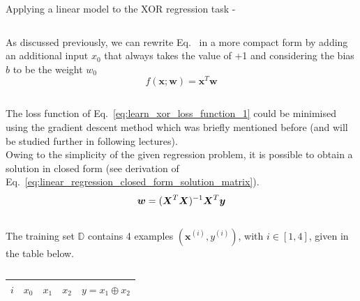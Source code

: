\begin{frame}[t,allowframebreaks]{
    Applying a linear model to the XOR regression task -}
\begin{columns}[t]
\begin{column}{0.50\textwidth}
            As discussed previously, we can rewrite 
            Eq.~\label{eq:learn_xor_linear_model_1}
            in a more compact form by adding an additional 
            input $x_0$ that always takes the value of +1 
            and considering the bias $b$ to be the weight $w_0$
            \begin{equation}
                f(\mathbf{x};\mathbf{w}) = \mathbf{x}^{T} \mathbf{w}
                \label{eq:learn_xor_linear_model_2}
            \end{equation}
        \end{column}
    \end{columns}
      
    \framebreak


    The \gls{loss function} 
    of Eq.~\ref{eq:learn_xor_loss_function_1} 
    could be minimised using the 
    \gls{gradient descent} 
    method which was briefly mentioned before 
    (and will be studied further in following lectures).\\
    \vspace{0.1cm}
    Owing to the simplicity of the given 
    \gls{regression} problem, 
    it is possible to obtain a solution in closed form 
    (see derivation of 
    Eq.~\ref{eq:linear_regression_closed_form_solution_matrix}).\\
    \vspace{-0.2cm}
    \begin{equation*}
        \boldsymbol{w} = (\boldsymbol{X}^T \boldsymbol{X})^{-1} \boldsymbol{X}^T \boldsymbol{y}
    \end{equation*}\\
    \vspace{0.1cm}
    The training set $\mathbb{D}$ contains 4 examples 
    $(\mathbf{x}^{(i)},y^{(i)})$, with $i \in [1,4]$, given in the table below.\\
    \vspace{0.1cm}
    \begin{columns}[t]
        \begin{column}{0.44\textwidth}
            \vspace{-0.6cm}
            \begin{center}
                \begin{tabular}{ c | c c c | c }
                 $i$ & $x_0$ & $x_1$ & $x_2$ & $y = x_1 \oplus x_2$ \\ 
                 \hline

\end{tabular}
\end{center}
\end{column}
\end{columns}
\end{frame}
